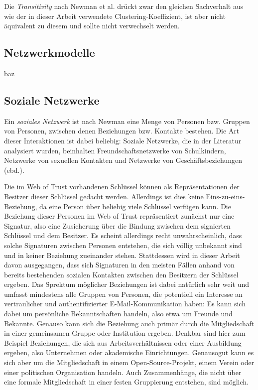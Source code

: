 Die \emph{Transitivity} nach Newman et al. dr\"uckt zwar den gleichen
Sachverhalt aus wie der in dieser Arbeit verwendete
Clustering-Koeffizient, ist aber nicht \"aquivalent zu diesem und
sollte nicht verwechselt werden.

\subsection{Netzwerkmodelle}
\label{sec:netzwerkmodelle}

\cite{Barabasi1999} 
baz

\subsection{Soziale Netzwerke}
\label{sec:soziale-netzwerke}

Ein \emph{soziales Netzwerk} ist nach Newman\cite{newman:167} eine
Menge von Personen bzw. Gruppen von Personen, zwischen denen
Beziehungen bzw. Kontakte bestehen. Die Art dieser Interaktionen ist
dabei beliebig: Soziale Netzwerke, die in der Literatur analysiert
wurden, beinhalten Freundschaftsnetzwerke von Schulkindern, Netzwerke
von sexuellen Kontakten und Netzwerke von Gesch\"aftsbeziehungen
(ebd.).

Die im Web of Trust vorhandenen Schl\"ussel k\"onnen als
Repr\"asentationen der Besitzer dieser Schl\"ussel gedacht
werden. Allerdings ist dies keine Eins-zu-eins-Beziehung, da eine
Person \"uber beliebig viele Schl\"ussel verf\"ugen kann. Die
Beziehung dieser Personen im Web of Trust repr\"asentiert zun\"achst
nur eine Signatur, also eine Zusicherung \"uber die Bindung zwischen
dem signierten Schl\"ussel und dem Besitzer. Es scheint allerdings
recht unwahrscheinlich, dass solche Signaturen zwischen Personen
entstehen, die sich v\"ollig unbekannt sind und in keiner Beziehung
zueinander stehen. Stattdessen wird in dieser Arbeit davon
ausgegangen, dass sich Signaturen in den meisten F\"allen anhand von
bereits bestehenden sozialen Kontakten zwischen den Besitzern der
Schl\"ussel ergeben. Das Sprektum m\"oglicher Beziehungen ist dabei
nat\"urlich sehr weit und umfasst mindestens alle Gruppen von
Personen, die potentiell ein Interesse an vertraulicher und
authentifizierter E-Mail-Kommunikation haben: Es kann sich dabei um
pers\"onliche Bekanntschaften handeln, also etwa um Freunde und
Bekannte. Genauso kann sich die Beziehung auch prim\"ar durch die
Mitgliedschaft in einer gemeinsamen Gruppe oder Institution
ergeben. Denkbar sind hier zum Beispiel Beziehungen, die sich aus
Arbeitsverh\"altnissen oder einer Ausbildung ergeben, also Unternehmen
oder akademische Einrichtungen. Genausogut kann es sich aber um die
Mitgliedschaft in einem Open-Source-Projekt, einem Verein oder einer
politischen Organisation handeln. Auch Zusammenh\"ange, die nicht
\"uber eine formale Mitgliedschaft in einer festen Gruppierung
entstehen, sind m\"oglich.

